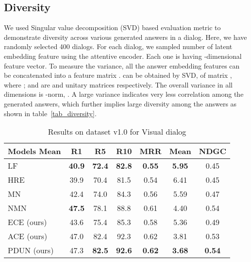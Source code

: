 \documentclass[review]{elsarticle}
\begin{document}
\subsection{Diversity}
We used Singular value decomposition (SVD) based evaluation metric to  demonstrate diversity across various generated answers in a dialog. Here, we have randomly selected 400 dialogs. For each dialog, we sampled  number of  latent embedding feature using the attentive encoder. Each one is having -dimensional feature vector. To measure the variance, all the answer embedding features can be concatenated into a feature matrix .  can be obtained  by SVD,  of matrix , where ;  and  are  and  unitary matrices respectively. The overall variance in all dimensions is -norm, . 
A large variance indicates very less correlation among the generated answers, which further implies large diversity among the answers as shown in table~\ref{tab_diversity}.
\begin{table*}[htb]
\begin{center}
		\begin{tabular}{|l|cccccc | } \hline
			
			\textbf{Models}	\textbf{Mean}& \textbf{R1} & \textbf{R5} & \textbf{R10} & \textbf{MRR} & \textbf{Mean} & \textbf{NDGC} \\ \hline 	
			LF \cite{Das_CVPR2017}  &\textbf{40.9}& \textbf{72.4}&\textbf{82.8} &\textbf{0.55} &\textbf{5.95}&  0.45\\
			HRE \cite{Das_CVPR2017} &39.9&70.4 &81.5&0.54& 6.41&0.45\\
			MN \cite{Das_CVPR2017} &42.4& 74.0& 84.3 & 0.56&5.59&0.47\\
			NMN \cite{kottur2018visual} & \textbf{47.5}& 78.1 &88.8& 0.61 &4.40 &0.54\\\hline
			ECE  (ours)   &43.6   & 75.4   &85.3  &0.58 & 5.36&0.49\\
			ACE (ours)   &47.0   & 82.4 &92.3  &0.62 & 3.81&0.53\\  
			PDUN (ours) &47.3   & \textbf{82.5}  &\textbf{92.6}  &\textbf{0.62} & \textbf{3.68}&\textbf{0.54}\\\hline
		\end{tabular}
	\end{center}
	\vspace{-2em}
	\caption{\label{score_tab_1_1}Results on dataset v1.0 for Visual dialog }
\end{table*}
\end{document}
